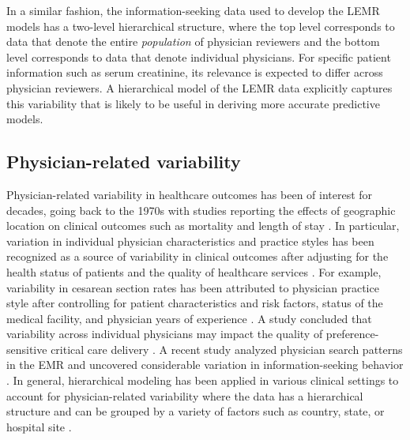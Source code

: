 In a similar fashion, the information-seeking data used to develop the LEMR models has a two-level hierarchical structure, where the top level corresponds to data that denote the entire \textit{population} of physician reviewers and the bottom level corresponds to data that denote individual physicians. For specific patient information such as serum creatinine, its relevance is expected to differ across physician reviewers. A hierarchical model of the LEMR data explicitly captures this variability that is likely to be useful in deriving more accurate predictive models.

\subsection{Physician-related variability}
Physician-related variability in healthcare outcomes has been of interest for decades, going back to the 1970s with studies reporting the effects of geographic location on clinical outcomes such as mortality and length of stay \cite{Burns1991}. In particular, variation in individual physician characteristics and practice styles has been recognized as a source of variability in clinical outcomes after adjusting for the health status of patients and the quality of healthcare services \cite{Ruppel2020,Wilkinson2013,Yadav2019,Garland2006,Guterman2016,Obermeyer2015,Pollack2017,DeMott1990}. For example, variability in cesarean section rates has been attributed to physician practice style after controlling for patient characteristics and risk factors, status of the medical facility, and physician years of experience \cite{DeMott1990}. A study concluded that variability across individual physicians may impact the quality of preference-sensitive critical care delivery \cite{Yadav2019}. A recent study analyzed physician search patterns in the EMR and uncovered considerable variation in information-seeking behavior \cite{Ruppel2020}. In general, hierarchical modeling has been applied in various clinical settings to account for physician-related variability where the data has a hierarchical structure and can be grouped by a variety of factors such as country, state, or hospital site \cite{Wang2011,Chung2013,Pan2018,Berta2016,Berta2019,Towne2018,Lin2017}.
